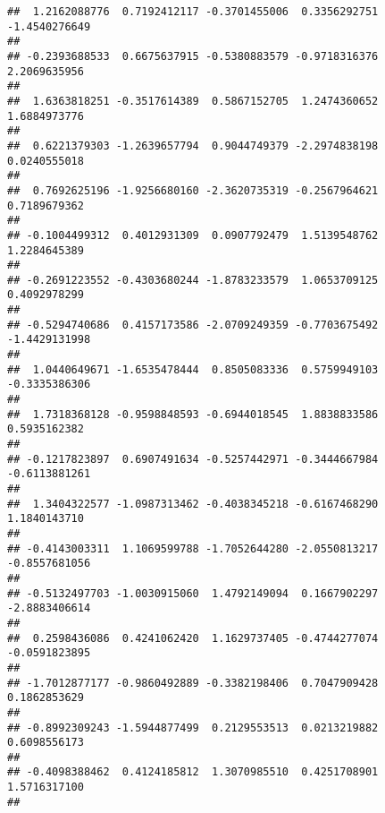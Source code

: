 \documentclass[]{article}
\begin{document}
\begin{verbatim}
##  1.2162088776  0.7192412117 -0.3701455006  0.3356292751 -1.4540276649 
##                                                                       
## -0.2393688533  0.6675637915 -0.5380883579 -0.9718316376  2.2069635956 
##                                                                       
##  1.6363818251 -0.3517614389  0.5867152705  1.2474360652  1.6884973776 
##                                                                       
##  0.6221379303 -1.2639657794  0.9044749379 -2.2974838198  0.0240555018 
##                                                                       
##  0.7692625196 -1.9256680160 -2.3620735319 -0.2567964621  0.7189679362 
##                                                                       
## -0.1004499312  0.4012931309  0.0907792479  1.5139548762  1.2284645389 
##                                                                       
## -0.2691223552 -0.4303680244 -1.8783233579  1.0653709125  0.4092978299 
##                                                                       
## -0.5294740686  0.4157173586 -2.0709249359 -0.7703675492 -1.4429131998 
##                                                                       
##  1.0440649671 -1.6535478444  0.8505083336  0.5759949103 -0.3335386306 
##                                                                       
##  1.7318368128 -0.9598848593 -0.6944018545  1.8838833586  0.5935162382 
##                                                                       
## -0.1217823897  0.6907491634 -0.5257442971 -0.3444667984 -0.6113881261 
##                                                                       
##  1.3404322577 -1.0987313462 -0.4038345218 -0.6167468290  1.1840143710 
##                                                                       
## -0.4143003311  1.1069599788 -1.7052644280 -2.0550813217 -0.8557681056 
##                                                                       
## -0.5132497703 -1.0030915060  1.4792149094  0.1667902297 -2.8883406614 
##                                                                       
##  0.2598436086  0.4241062420  1.1629737405 -0.4744277074 -0.0591823895 
##                                                                       
## -1.7012877177 -0.9860492889 -0.3382198406  0.7047909428  0.1862853629 
##                                                                       
## -0.8992309243 -1.5944877499  0.2129553513  0.0213219882  0.6098556173 
##                                                                       
## -0.4098388462  0.4124185812  1.3070985510  0.4251708901  1.5716317100 
##                                                                       

\end{verbatim}
\end{document}
